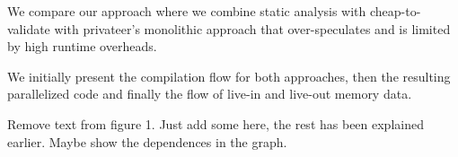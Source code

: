 We compare our approach where we combine static analysis with cheap-to-validate
with privateer's monolithic approach that over-speculates and is limited by high
runtime overheads.

We initially present the compilation flow for both approaches, then the
resulting parallelized code and finally the flow of live-in and live-out memory
data.

Remove text from figure 1. Just add some here, the rest has been explained
earlier.
Maybe show the dependences in the graph.

%


